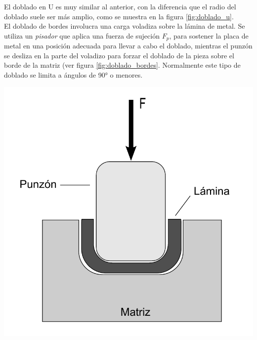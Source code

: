 El doblado en U es muy similar al anterior, con la diferencia que el radio del doblado 
suele ser más amplio, como se muestra en la figura \ref{fig:doblado_u}. \\

El doblado de bordes involucra una carga voladiza sobre la lámina de metal. Se utiliza 
un \textit{pisador} que aplica una fuerza de sujeción $F_p$, para sostener la placa de 
metal en una posición adecuada para llevar a cabo el doblado, mientras el punzón 
se desliza en la parte del voladizo para forzar el doblado de la pieza sobre el borde 
de la matriz (ver figura \ref{fig:doblado_bordes}. Normalmente este tipo de doblado 
se limita a ángulos de 90° o menores.

\begin{center}
\includegraphics[scale=0.35]{src/ch2/doblado_u}
\label{fig:doblado_u}
\end{center}


